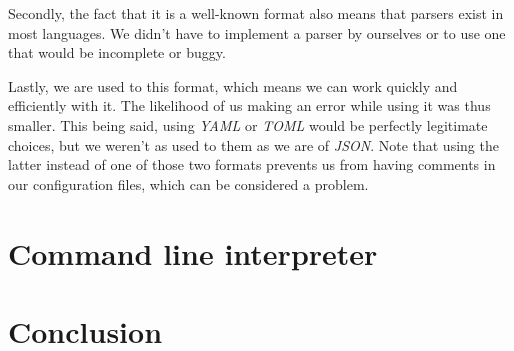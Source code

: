 		Secondly, the fact that it is a well-known format also means that parsers exist in most languages. We didn't have to implement a parser by ourselves or to use one that would be incomplete or buggy.

		Lastly, we are used to this format, which means we can work quickly and efficiently with it. The likelihood of us making an error while using it was thus smaller. This being said, using \textit{YAML} or \textit{TOML} would be perfectly legitimate choices, but we weren't as used to them as we are of \textit{JSON}. Note that using the latter instead of one of those two formats prevents us from having comments in our configuration files, which can be considered a problem.
	
	\section{Command line interpreter}

	\section{Conclusion}


